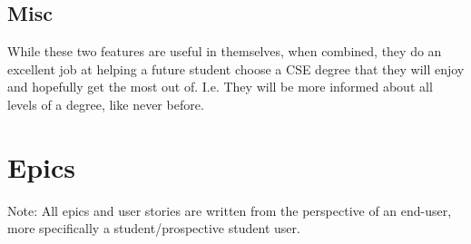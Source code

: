 \documentclass[12pt,titlepage]{article}
\begin{document}
\subsection{Misc}
While these two features are useful in themselves, when combined, they do an
excellent job at helping a future student choose a CSE degree that they will
enjoy and hopefully get the most out of. I.e. They will be more informed about
all levels of a degree, like never before.

\section{Epics}

Note: All epics and user stories are written from the perspective of an
end-user, more specifically a student/prospective student user.

\newcommand{\epicOne}{
   Be able to visit a website in my web browser with an appealing interface.
}
\newcommand{\epicTwo}{
   Be able to choose the CSE degree I am interested in studying at UNSW.
}
\newcommand{\epicThree}{
   See what courses I have to take in order to complete a degree.
}
\newcommand{\epicFour}{
   Observe what electives I can choose throughout my degree and add them into my
   degree plan.
}
\newcommand{\epicFive}{
   Save my degree so that I can come back and edit it later on.
}
\newcommand{\epicSix}{
   Export my degree plan as a PDF document.
}
\newcommand{\epicSeven}{
   Browse through the list of courses offered by UNSW and to be able to sort and
   filter them in various ways.
}
\newcommand{\epicEight}{
   View the review page of a course which contains various forms of ratings and
   detailed reviews of the course, submitted by previous students.
}
\newcommand{\epicNine}{
   Be able to submit a review of a course I have previously studied and have it
   added to the pool of reviews for a course (i.e. my review should appear on
   the course review page).
}
\newcommand{\epicTen}{
   I should be able to edit any part of any review I have ever submitted, at any
   time in the future and the course review page should be updated accordingly.
}
\newcommand{\epicEleven}{
   Users should be able to create an account, but have to supply an email
   address with a ``.*unsw.edu.au'' domain and follow the activation link sent
   to that email, in order to confirm they are a UNSW student.
}
\newcommand{\epicTwelve}{
   There should be a user profile page that allows users to edit their profile
   details, lists all their degree plans and all their course reviews.
}
\newcommand{\epicThirteen}{
   I should be able to plan other UNSW degrees beyond the school of Computer
   Science and Engineering.
}
\end{document}
